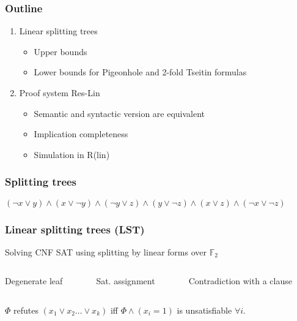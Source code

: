 \begin{frame}
    \frametitle{Outline}
    \begin{enumerate}
		\item Linear splitting trees
			\begin{itemize}
				\item Upper bounds
				\item Lower bounds for Pigeonhole and 2-fold Tseitin formulas
			\end{itemize}

		\item Proof system Res-Lin 
			\begin{itemize}
				\item Semantic and syntactic version are equivalent
				\item Implication completeness
				\item Simulation in R(lin)
			\end{itemize}

	\end{enumerate}
\end{frame}


\begin{frame}
    \frametitle{Splitting trees}
    $(\lnot x \lor y) \land (x \lor \lnot y) \land (\lnot y \lor z) \land
    	(y \lor \lnot z) \land (x \lor z) \land (\lnot x \lor \lnot z)$ 
	\only<1>{}
	\only<2>{}
\end{frame}



\begin{frame}
    \frametitle{Linear splitting trees (LST)}
	Solving CNF SAT using splitting by linear forms over $\mathbb{F}_2$
    \begin{columns}
        \begin{column}{3cm}
            Degenerate leaf
            
        \end{column}
        \begin{column}{3cm}
            Sat. assignment
            
        \end{column}
        \begin{column}{3cm}
            Contradiction with a clause
            
        \end{column}
    \end{columns}
    
	$\Phi$ refutes $(x_1 \lor x_2 \dots \lor x_k)$ iff $\Phi \land (x_i = 1)$ is
    unsatisfiable $\forall i$.
\end{frame}




